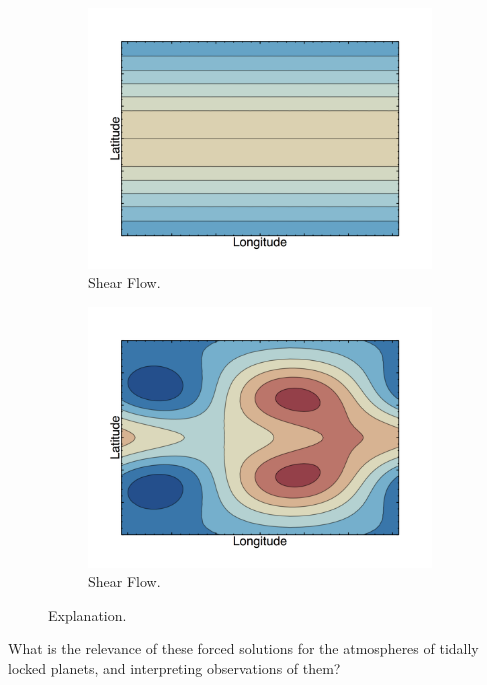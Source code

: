 \begin{figure}
\begin{subfigure}[b]{0.24\textwidth}
    \includegraphics[width=\textwidth]{figures/wave-mean-flow/expl-phibar.png}
    \caption{Shear Flow.}
    \label{fig:expl-phibar}
  \end{subfigure}
  \begin{subfigure}[b]{0.24\textwidth}
    \includegraphics[width=\textwidth]{figures/wave-mean-flow/expl-plot-total.png}
    \caption{Shear Flow.}
    \label{fig:expl-plot-total}
  \end{subfigure}
  \caption{Explanation.}
  \label{fig:first-order-solutions}
\end{figure}



What is the relevance of these forced solutions for the atmospheres of tidally locked planets, and interpreting observations of them?

